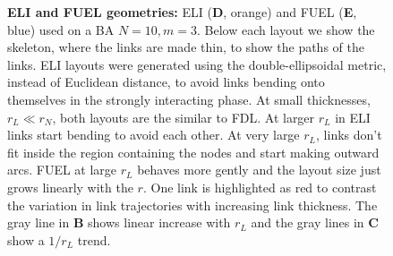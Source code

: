 \begin{figure}
{         {\bf ELI and FUEL geometries:} 
         ELI ({\bf D}, orange) and FUEL ({\bf E}, blue) used on a BA $N=10, m=3$. 
         Below each layout we show the skeleton, where the links are made thin, to show the paths of the links.
         ELI layouts were generated using the double-ellipsoidal metric, instead of Euclidean distance, to avoid links bending onto themselves in the strongly interacting phase. 
         At small thicknesses, $r_L \ll r_N$, both layouts are the similar to FDL. At larger $r_L$ in ELI links start bending to avoid each other. 
         At very large $r_L$, links don't fit inside the region containing the nodes and start making outward arcs. 
         FUEL at large $r_L$ behaves more gently and the layout size just grows linearly with the $r$.
         One link is highlighted as red to contrast the variation in link trajectories with increasing link thickness.
         The gray line in {\bf B} shows linear increase with $r_L$ and the gray lines in {\bf C} show a $1/r_L$ trend. 
          }    
    \label{fig:phase-compare}
\end{figure}






